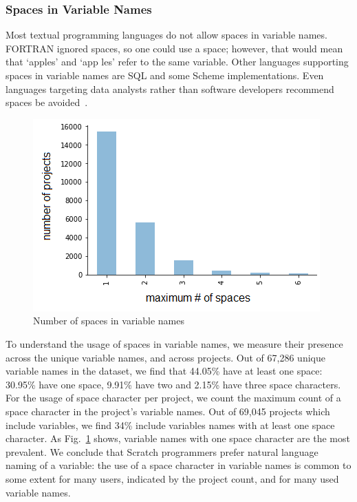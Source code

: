 \documentclass[conference]{IEEEtran}
\begin{document}
\subsubsection{Spaces in Variable Names}
Most textual programming languages do not allow spaces in variable names. 
FORTRAN ignored spaces, so one could use a space; however, that would mean that `apples' and `app les' refer to the same variable. Other languages supporting spaces in variable names are SQL and some Scheme implementations. 
Even languages targeting data analysts rather than software developers recommend spaces be avoided~\cite{Bochud}.
\begin{figure}[tb]
	\begin{center}
		\includegraphics[width=0.8\columnwidth]{fig/project/space_final}
		\caption{Number of spaces in variable names}
		\label{fig:number_of_spaces}
	\end{center}
\end{figure} 
To understand the usage of spaces in variable names, we measure their presence across the unique variable names, and across projects. Out of 67,286 unique variable names in the dataset, we find that 44.05\% have at least one space: 30.95\% have one space, 9.91\% have two and 2.15\% have three space characters. For the usage of space character per project, we count the maximum count of a space character in the project's variable names. Out of 69,045 projects which include variables, we find 34\% include variables names with at least one space character. As Fig.~\ref{fig:number_of_spaces} shows, variable names with one space character are the most prevalent. 
We conclude that Scratch programmers prefer natural language naming of a variable: the use of a space character in variable names is common to some extent for many users, indicated by the project count, and for many used variable names. 
\end{document}
